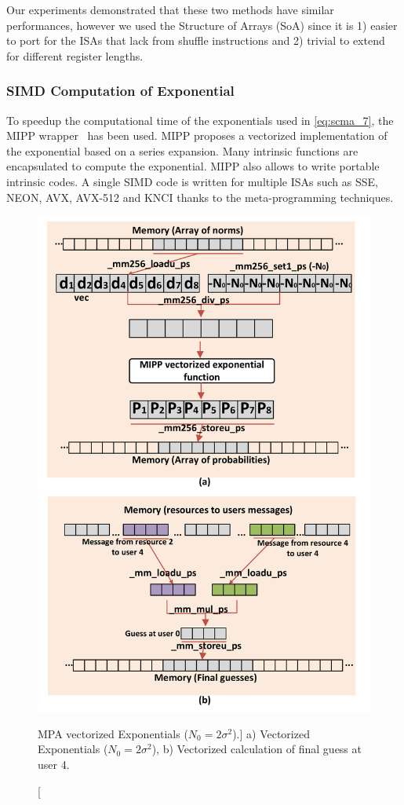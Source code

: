 Our experiments demonstrated that these two methods have similar performances,
however we used the Structure of Arrays (SoA) since it is 1) easier to port for
the ISAs that lack from shuffle instructions and 2) trivial to extend for
different register lengths.

\subsubsection{SIMD Computation of Exponential}

To speedup the computational time of the exponentials used in \eqref{eq:scma_7},
the MIPP wrapper~\cite{Cassagne2018} has been used. MIPP proposes a vectorized
implementation of the exponential based on a series expansion. Many intrinsic
functions are encapsulated to compute the exponential. MIPP also allows to write
portable intrinsic codes. A single SIMD code is written for multiple ISAs such
as SSE, NEON, AVX, AVX-512 and KNCI thanks to the meta-programming techniques.

\begin{figure}[htp]
  \centering
  \includegraphics[width=0.70\linewidth]{scma/simd_exp_mul/simd_exp_mul}
  \caption
    [MPA vectorized Exponentials ($N_0 = 2\sigma^2$).]
    {a) Vectorized Exponentials ($N_0 = 2\sigma^2$),
     b) Vectorized calculation of final guess at user 4.}
  \label{fig:scma_simd_exp_mul}
\end{figure}

